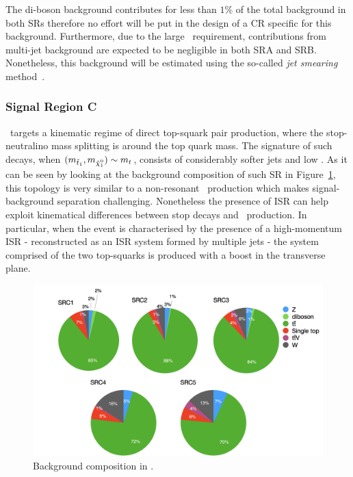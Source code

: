				The di-boson background contributes for less than $1\%$ of the total background in both \acp{SR} therefore no effort will be put in the design of a \ac{CR} specific for this background. Furthermore, due to the large \met\ requirement, contributions from multi-jet background are expected to be negligible in both SRA and SRB. Nonetheless, this background will be estimated using the so-called \emph{jet smearing} method~\cite{calumThesis}.




			\subsubsection*{Signal Region C}

				\SRC\ targets a kinematic regime of direct top-squark pair production, where the stop-neutralino mass splitting is around the top quark mass. The signature of such decays, when $(\mstopone, \mninoone) \sim m_t$, consists of considerably softer jets and low \met. As it can be seen by looking at the background composition of such \ac{SR} in Figure~\ref{fig:SRC_bkgcomp}, this topology is very similar to a non-resonant \ttbar\ production which makes signal-background separation challenging. Nonetheless the presence of \ac{ISR} can help exploit kinematical differences between stop decays and \ttbar\ production. In particular, when the event is characterised by the presence of a high-momentum \ac{ISR} - reconstructed as an \ac{ISR} system formed by multiple jets - the system comprised of the two top-squarks is produced with a boost in the transverse plane.

				\begin{figure}[t]
				  \begin{center}
				   \includegraphics[width=\textwidth]{figures/stop/piechart_SRCcomp}
				   \caption{Background composition in \SRC.}
				   \label{fig:SRC_bkgcomp}
				  \end{center}
				\end{figure}

